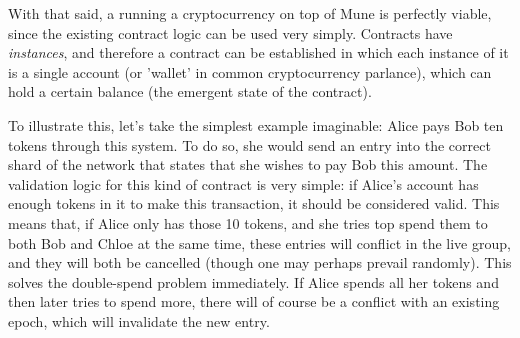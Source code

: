 \documentclass{extreport}
\begin{document}
With that said, a running a cryptocurrency on top of Mune is perfectly viable, since the existing contract logic can be used very simply. Contracts have \emph{instances}, and therefore a contract can be established in which each instance of it is a single account (or 'wallet' in common cryptocurrency parlance), which can hold a certain balance (the emergent state of the contract).

To illustrate this, let's take the simplest example imaginable: Alice pays Bob ten tokens through this system. To do so, she would send an entry into the correct shard of the network that states that she wishes to pay Bob this amount. The validation logic for this kind of contract is very simple: if Alice's account has enough tokens in it to make this transaction, it should be considered valid. This means that, if Alice only has those 10 tokens, and she tries top spend them to both Bob and Chloe at the same time, these entries will conflict in the live group, and they will both be cancelled (though one may perhaps prevail randomly). This solves the double-spend problem immediately. If Alice spends all her tokens and then later tries to spend more, there will of course be a conflict with an existing epoch, which will invalidate the new entry.
\end{document}
